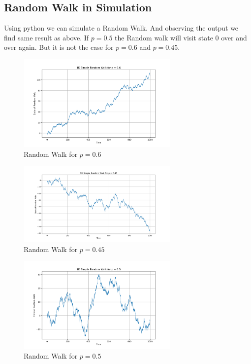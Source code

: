 \subsection{Random Walk in Simulation}
Using python we can simulate a Random Walk. And observing the output we find same result as above. 
If $ p = 0.5 $ the Random walk will visit state 0 over and over again. But it is not the case 
for $ p = 0.6 $ and  $ p = 0.45 $.

\begin{figure}[H]
    \centering
    \includegraphics[width=0.7\textwidth]{pic/Random_Walk_0.6.png}
    \caption{Random Walk for $p=0.6$}
    \label{fig:0.6}
\end{figure}
\begin{figure}[H]
    \centering
    \includegraphics[width=0.7\textwidth]{pic/Random_Walk_0.45.png}
    \caption{Random Walk for $p=0.45$}
    \label{fig:0.45}
\end{figure}


\begin{figure}[H]
    \centering
    \includegraphics[width=0.7\textwidth]{pic/Random_Walk_0.5.png}
    \caption{Random Walk for $p=0.5$}
    \label{fig:0.5}
\end{figure}

